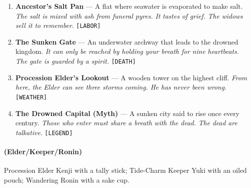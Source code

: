 \begin{enumerate}
  \hfill \textit{The ninth cup is never poured. It is for the dead. The dead sometimes drink it.} \texttt{[SOCIAL]}
\item {} \textbf{Ancestor's Salt Pan} --- A flat where seawater is evaporated to make salt.
  \hfill \textit{The salt is mixed with ash from funeral pyres. It tastes of grief. The widows sell it to remember.} \texttt{[LABOR]}
\item {} \textbf{The Sunken Gate} --- An underwater archway that leads to the drowned kingdom.
  \hfill \textit{It can only be reached by holding your breath for nine heartbeats. The gate is guarded by a spirit.} \texttt{[DEATH]}
\item {} \textbf{Procession Elder's Lookout} --- A wooden tower on the highest cliff.
  \hfill \textit{From here, the Elder can see three storms coming. He has never been wrong.} \texttt{[WEATHER]}
\item {} \textbf{The Drowned Capital (Myth)} --- A sunken city said to rise once every century.
  \hfill \textit{Those who enter must share a breath with the dead. The dead are talkative.} \texttt{[LEGEND]}
\end{enumerate}

\paragraph*{(Elder/Keeper/Ronin)} Procession Elder Kenji with a tally stick; Tide-Charm Keeper Yuki with an oiled pouch; Wandering Ronin with a sake cup.

